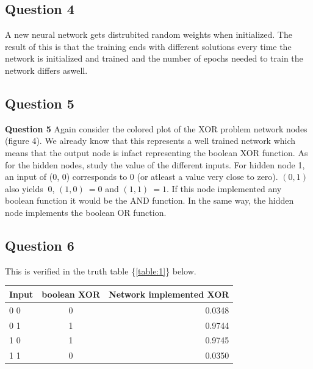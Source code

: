 \documentclass[a4paper]{article}
\begin{document}
\subsection*{Question 4}
A new neural network gets distrubited random weights 
when initialized. The result of this is that the training ends with different 
solutions every time the network is initialized and trained and the 
number of epochs needed to train the network differs aswell. 
\subsection*{Question 5}
\textbf{Question 5} Again consider the colored plot of the XOR problem 
network nodes (figure 4). We already 
know that this represents a well trained network which means that the output node is 
infact representing the boolean XOR function. As for the hidden nodes, study the value 
of the different inputs. For hidden node 1, an input of (0, 0) corresponds to 0 (or 
atleast a value very close to zero). $(0, 1)$ also yields $~ 0$, $(1, 0) ~= 0$ and 
$(1, 1) ~= 1$. If this node implemented any boolean function it would be the AND function.
In the same way, the hidden node implements the boolean OR function. 
\subsection*{Question 6}
This is verified in the truth table \{\ref{table:1}\} below. 

\begin{center}
	\label{table:1}
    \begin{tabular} {l | c | r }
        Input & boolean XOR & Network implemented XOR \\
		\hline
        0 0 & 0 & 0.0348 \\
        0 1 & 1 & 0.9744 \\
        1 0 & 1 & 0.9745 \\
        1 1 & 0 & 0.0350 \\
    \end{tabular}
\end{center}
\end{document}
